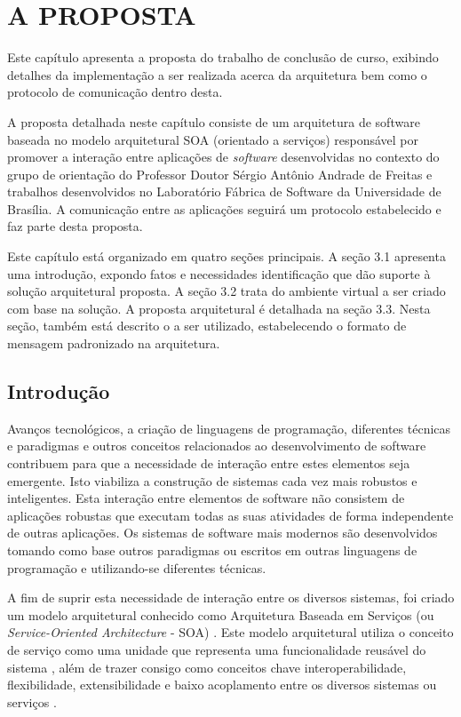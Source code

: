 \chapter[A PROPOSTA]{A PROPOSTA}

Este capítulo apresenta a proposta do trabalho de conclusão de curso, exibindo detalhes da implementação a ser realizada acerca da arquitetura bem como o protocolo de comunicação dentro desta.

A proposta detalhada neste capítulo consiste de um arquitetura de software baseada no modelo arquitetural SOA (orientado a serviços) responsável por promover a interação entre aplicações de \textit{software} desenvolvidas no contexto do grupo de orientação do Professor Doutor Sérgio Antônio Andrade de Freitas e trabalhos desenvolvidos no Laboratório Fábrica de Software da Universidade de Brasília. A comunicação entre as aplicações seguirá um protocolo estabelecido e faz parte desta proposta.

Este capítulo está organizado em quatro seções principais. A seção 3.1 apresenta uma introdução, expondo fatos e necessidades identificação que dão suporte à solução arquitetural proposta. A seção 3.2 trata do ambiente virtual a ser criado com base na solução. A proposta arquitetural é detalhada na seção 3.3. Nesta seção, também está descrito o a ser utilizado, estabelecendo o formato de mensagem padronizado na arquitetura.

\section{Introdução}
Avanços tecnológicos, a criação de linguagens de programação, diferentes técnicas e paradigmas e outros conceitos relacionados ao desenvolvimento de software contribuem para que a necessidade de interação entre estes elementos seja emergente. Isto viabiliza a construção de sistemas cada vez mais robustos e inteligentes. Esta interação entre elementos de software não consistem de aplicações robustas que executam todas as suas atividades de forma independente de outras aplicações. Os sistemas de software mais modernos são desenvolvidos tomando como base outros paradigmas ou escritos em outras linguagens de programação e utilizando-se diferentes técnicas.

A fim de suprir esta necessidade de interação entre os diversos sistemas, foi criado um modelo arquitetural conhecido como Arquitetura Baseada em Serviços (ou \textit{Service-Oriented Architecture} - SOA) \cite{linthicum_soainrealworld_2007}. Este modelo arquitetural utiliza o conceito de serviço como uma unidade que representa uma funcionalidade reusável do sistema \cite{lewis_getting_2010}, além de trazer consigo como conceitos chave interoperabilidade, flexibilidade, extensibilidade e baixo acoplamento entre os diversos sistemas ou serviços \cite{josuttis_soa_2007}.

